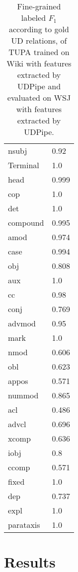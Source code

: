 \documentclass[11pt,a4paper]{article}
\begin{document}
\begin{table}[t]
\centering
\small
\setlength\tabcolsep{3pt}
\begin{tabular}{l|l}
nsubj & 0.92 \\ 
Terminal & 1.0 \\ 
head & 0.999 \\ 
cop & 1.0 \\ 
det & 1.0 \\    
compound & 0.995 \\ 
amod & 0.974 \\ 
case & 0.994 \\ 
obj & 0.808 \\ 
aux & 1.0 \\ 
cc & 0.98 \\ 
conj & 0.769 \\ 
advmod & 0.95 \\ 
mark & 1.0 \\ 
nmod & 0.606 \\ 
obl & 0.623 \\ 
appos & 0.571 \\ 
nummod & 0.865 \\ 
acl & 0.486 \\ 
advcl & 0.696 \\ 
xcomp & 0.636 \\ 
iobj & 0.8 \\ 
ccomp & 0.571 \\ 
fixed & 1.0 \\ 
dep & 0.737 \\ 
expl & 1.0 \\  
parataxis & 1.0
\end{tabular}
\caption{
Fine-grained labeled $F_1$ according to gold UD relations,
of TUPA trained on Wiki with features extracted by UDPipe
and evaluated on WSJ with features extracted by UDPipe.}
\label{tab:fine_grained_ud}
\end{table}


%
%
%
%
%
\section{Results}\label{sec:results}
\end{document}
